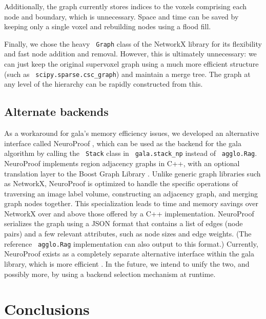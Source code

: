 \documentclass{frontiersSCNS} %
\begin{document}
Additionally, the graph currently stores indices to the voxels comprising each node and boundary, which is unnecessary.
Space and time can be saved by keeping only a single voxel and rebuilding nodes using a flood fill.

Finally, we chose the heavy \texttt{ \small Graph} class of the NetworkX library for its flexibility and fast node addition and removal.
However, this is ultimately unnecessary: we can just keep the original supervoxel graph using a much more efficient structure (such as \texttt{ \small scipy.sparse.csc\_graph}) and maintain a merge tree.
The graph at any level of the hierarchy can be rapidly constructed from this.

\subsection{Alternate backends}
\label{section:np}

As a workaround for gala's memory efficiency issues, we developed an alternative interface called NeuroProof \citep{np}, which can be used as the backend for the gala algorithm by calling the \texttt{ \small Stack} class in \texttt{ \small gala.stack\_np} instead of \texttt{ \small agglo.Rag}.
NeuroProof implements region adjacency graphs in C++, with an optional translation layer to the Boost Graph Library \citep{bgl}.
Unlike generic graph libraries such as NetworkX, NeuroProof is optimized to handle the specific operations of traversing an image label volume, constructing an adjacency graph, and merging graph nodes together.
This specialization leads to time and memory savings over NetworkX over and above those offered by a C++ implementation.
NeuroProof serializes the graph using a JSON format that contains a list of edges (node pairs) and a few relevant attributes, such as node sizes and edge weights.
(The reference \texttt{ \small agglo.Rag} implementation can also output to this format.)
Currently, NeuroProof exists as a completely separate alternative interface within the gala library, which is more efficient .
In the future, we intend to unify the two, and possibly more, by using a backend selection mechanism at runtime.

\section{Conclusions}

\end{document}
